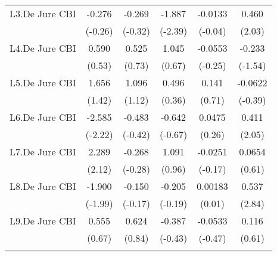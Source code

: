 \begin{table}[htbp]
\begin{tabular}{l*{5}{c}}
\addlinespace
L3.De Jure CBI                          &   -0.276         &   -0.269         &   -1.887\sym{*}  &  -0.0133         &    0.460\sym{*}  \\
                                        &  (-0.26)         &  (-0.32)         &  (-2.39)         &  (-0.04)         &   (2.03)         \\
\addlinespace
L4.De Jure CBI                          &    0.590         &    0.525         &    1.045         &  -0.0553         &   -0.233         \\
                                        &   (0.53)         &   (0.73)         &   (0.67)         &  (-0.25)         &  (-1.54)         \\
\addlinespace
L5.De Jure CBI                          &    1.656         &    1.096         &    0.496         &    0.141         &  -0.0622         \\
                                        &   (1.42)         &   (1.12)         &   (0.36)         &   (0.71)         &  (-0.39)         \\
\addlinespace
L6.De Jure CBI                          &   -2.585\sym{*}  &   -0.483         &   -0.642         &   0.0475         &    0.411\sym{*}  \\
                                        &  (-2.22)         &  (-0.42)         &  (-0.67)         &   (0.26)         &   (2.05)         \\
\addlinespace
L7.De Jure CBI                          &    2.289\sym{*}  &   -0.268         &    1.091         &  -0.0251         &   0.0654         \\
                                        &   (2.12)         &  (-0.28)         &   (0.96)         &  (-0.17)         &   (0.61)         \\
\addlinespace
L8.De Jure CBI                          &   -1.900\sym{*}  &   -0.150         &   -0.205         &  0.00183         &    0.537\sym{**} \\
                                        &  (-1.99)         &  (-0.17)         &  (-0.19)         &   (0.01)         &   (2.84)         \\
\addlinespace
L9.De Jure CBI                          &    0.555         &    0.624         &   -0.387         &  -0.0533         &    0.116         \\
                                        &   (0.67)         &   (0.84)         &  (-0.43)         &  (-0.47)         &   (0.61)         \\
\addlinespace

\end{tabular}
\end{table}
